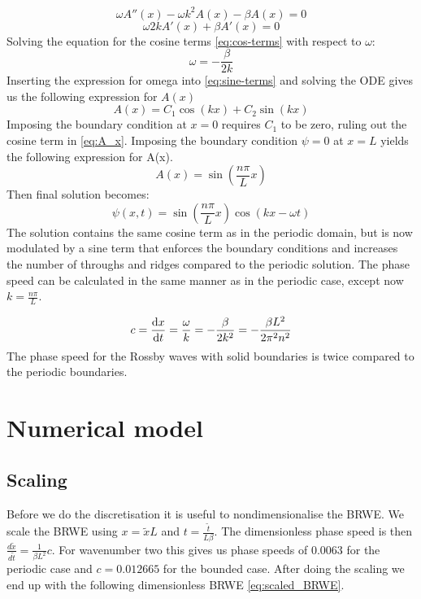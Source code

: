 \begin{equation}\label{eq:sine-terms}
    \omega A''(x) -\omega k^2 A(x) - \beta A(x) = 0
\end{equation}
\begin{equation}\label{eq:cos-terms}
    \omega 2 k A'(x) + \beta A'(x) = 0
\end{equation}
Solving the equation for the cosine terms \cref{eq:cos-terms} with respect to
$\omega$:
\begin{equation}
    \omega = -\frac{\beta}{2k}
\end{equation}
Inserting the expression for omega into \cref{eq:sine-terms} and solving the ODE
gives us the following expression for $A(x)$
\begin{equation}\label{eq:A_x}
    A(x) = C_1 \cos{(kx) + C_2 \sin{(kx)}}
\end{equation}
Imposing the boundary condition at $x=0$ requires $C_1$ to be zero, ruling
out the cosine term in \cref{eq:A_x}. Imposing the boundary condition $\psi=0$
at $x=L$ yields the following expression for A(x).
\begin{equation}
    A(x) = \sin{\left(\frac{n\pi}{L} x \right)}
\end{equation}
Then final solution becomes:
\begin{equation}
    \psi(x,t) = \sin{\left(\frac{n\pi}{L} x \right)} \cos{(kx - \omega t)}
\end{equation}
The solution contains the same cosine term as in the periodic domain, but is now
modulated by a sine term that enforces the boundary conditions and increases
the number of throughs and ridges compared to the periodic solution.
The phase speed can be calculated in the same manner as in the periodic case,
except now $k=\frac{n\pi}{L}$.

\begin{equation}
    c = \dv{x}{t} = \frac{\omega}{k} = -\frac{\beta}{2k^2} = -\frac{\beta L^2}{2 
    \pi^2 n^2}
\end{equation}
The phase speed for the Rossby waves with solid boundaries is twice compared to
the periodic boundaries.

\section{Numerical model}


\subsection{Scaling}
Before we do the discretisation it is useful to nondimensionalise the BRWE.
We scale the BRWE using $x = \tilde{x} L $ and $t = \frac{\tilde{t}}{L \beta}$.
The dimensionless phase speed is then $\frac{d\tilde{x}}{d\tilde{t}} = \frac{1}
{\beta L^2} c$. For wavenumber two this gives us phase speeds of
$0.0063$ for the periodic case and $c = 0.012665$ for the bounded case.
After doing the scaling we end up with the following dimensionless BRWE
\cref{eq:scaled_BRWE}.

